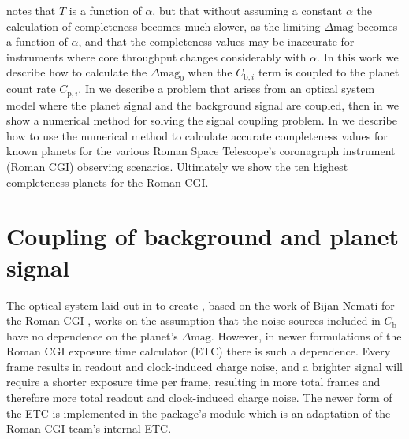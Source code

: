 \citet{keithlyOptimalScheduling2020} notes that $T$ is a function of $\alpha$,
but that without assuming a constant $\alpha$ the calculation of completeness
becomes much slower, as the limiting $\Delta\textrm{mag}$ becomes a function of
$\alpha$, and that the completeness values may be inaccurate for instruments
where core throughput changes considerably with $\alpha$. In this work we
describe how to calculate the $\Delta\textrm{mag}_0$ when the
$C_{\textrm{b},i}$ term is coupled to the planet count rate $C_{\textrm{p},i}$.
In  we describe a problem
that arises from an optical system model where the planet signal and the
background signal are coupled, then in  we
show a numerical method for solving the signal coupling problem. In
 we describe how to use the numerical method to
calculate accurate completeness values for known planets for the various Roman
Space Telescope's coronagraph instrument (Roman CGI) observing scenarios.
Ultimately we show the ten highest completeness planets for the Roman CGI.

\section{Coupling of background and planet signal} %
\label{sec:Coupling of background and planet signal}

The optical system laid out in \citet{keithlyOptimalScheduling2020} to create
, based on the work of Bijan Nemati for the Roman CGI
\citep{Nemati2014, nematiSensitivityWFIRST2017, Nemati2020a}, works on the
assumption that the noise sources included in $C_{\textrm{b}}$ have no
dependence on the planet's $\Delta\textrm{mag}$. However, in newer formulations
of the Roman CGI exposure time calculator (ETC) there is such a dependence. Every
frame results in readout and clock-induced charge noise, and a brighter signal
will require a shorter exposure time per frame, resulting in more total frames
and therefore more total readout and clock-induced charge noise. The newer form
of the ETC is implemented in the  package's 
module \citep{savranskyWFIRSTAFTACoronagraphScience2015} which is an adaptation
of the Roman CGI team's internal ETC.

